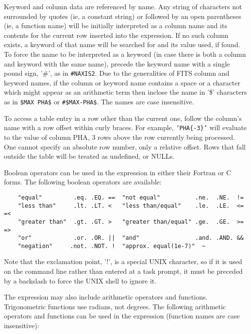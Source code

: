 \documentclass[11pt]{article}
\begin{document}
Keyword and column data  are referenced by   name.  Any  string of
characters not surrounded by    quotes (ie, a constant  string)   or
followed by   an open parentheses (ie,   a  function name)   will be
initially interpreted   as a column  name and  its contents for the
current row inserted into the expression.  If no such column exists,
a keyword of that  name will be searched for  and its value used, if
found.  To force the  name to be  interpreted as a keyword (in case
there is both a column and keyword with the  same name), precede the
keyword name with a single pound sign, '\#', as in {\tt \#NAXIS2}.  Due to
the generalities of FITS column and  keyword names, if the column or
keyword name  contains a space or a  character which might appear as
an arithmetic  term then inclose  the  name in '\$'  characters as in
{\tt \$MAX PHA\$} or {\tt \#\$MAX-PHA\$}.  The names are case insensitive.

To access a table entry in a row other  than the current one, follow
the  column's name  with  a row  offset  within  curly  braces.  For
example, {\tt'PHA\{-3\}'} will evaluate to the value  of column PHA, 3 rows
above  the  row currently  being processed.   One  cannot specify an
absolute row number, only a relative offset.  Rows that fall outside
the table will be treated as undefined, or NULLs.

Boolean   operators can be  used in  the expression  in either their
Fortran or C forms.  The following boolean operators are available:

\begin{verbatim}
    "equal"         .eq. .EQ. ==  "not equal"          .ne.  .NE.  !=
    "less than"     .lt. .LT. <   "less than/equal"    .le.  .LE.  <= =<
    "greater than"  .gt. .GT. >   "greater than/equal" .ge.  .GE.  >= =>
    "or"            .or. .OR. ||  "and"                .and. .AND. &&
    "negation"     .not. .NOT. !  "approx. equal(1e-7)"  ~
\end{verbatim}

Note  that the exclamation point,  '!', is a special UNIX character, so
if it is used  on the command line rather than entered at a task
prompt, it must be  preceded by a backslash to force the UNIX shell to
ignore it.

The expression may  also include arithmetic operators and functions.
Trigonometric  functions use  radians,  not degrees.  The  following
arithmetic  operators and  functions  can be  used in the expression
(function names are case insensitive):
\end{document}
